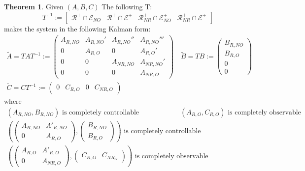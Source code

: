 \documentclass{book}
\theoremstyle{definition}
\newtheorem{theorem}{Theorem}[section]
\theoremstyle{remark}
\theoremstyle{remark}
\begin{document}
\begin{theorem}
    Given $(A,B,C)$ The following T:
    \[
        T^{-1}:=\begin{bmatrix}
            \mathcal{R}^+ \cap \mathcal{E}_{NO} & \mathcal{R}^+ \cap \mathcal{E}^+ & \mathcal{R}^+_{NR} \cap \mathcal{E}^+_{NO} & \mathcal{R}^+_{NR} \cap \mathcal{E}^+ 
        \end{bmatrix}
    \]
    makes the system in the following Kalman form:
    \begin{gather*}
        \tilde{A} = TAT^{-1} := \begin{pmatrix}
            A_{R,NO} & A_{R,NO}' & A_{R,NO}'' & A_{R,NO}'''\\
            0 & A_{R,O} & 0 & A_{R,O}'\\
            0 & 0 & A_{NR,NO} & A_{NR,NO}'\\
            0 & 0 & 0 & A_{NR,O}
        \end{pmatrix} \quad \tilde{B}=TB:= \begin{pmatrix}
            B_{R,NO}\\B_{R,O}\\0\\0
        \end{pmatrix} \\ \tilde{C} = CT^{-1}:=\begin{pmatrix}
            0 & C_{R,O} & 0 & C_{NR,O}
        \end{pmatrix}
    \end{gather*}
    where
    \begin{gather*}
        (A_{R,NO},B_{R,NO}) \text{ is completely controllable} \qquad \qquad \qquad (A_{R,O},C_{R,O}) \text{ is completely observable}\\
        \left( \begin{pmatrix}
            A_{R,NO} & A'_{R,NO}\\
            0 & A_{R,O}
        \end{pmatrix}, \begin{pmatrix}
            B_{R,NO}\\B_{R,O}
        \end{pmatrix} \right) \text{ is completely controllable} \\ \left( 
            \begin{pmatrix}
                A_{R,O} & A'_{R,O}\\
                0 & A_{NR,O}
            \end{pmatrix},\begin{pmatrix}
                C_{R,O} & C_{NR_O}
            \end{pmatrix}\right) \text{ is completely observable}
    \end{gather*}
\end{theorem}
\end{document}
